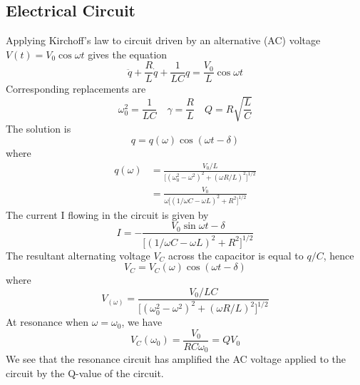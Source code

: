 \documentclass[../../../main.tex]{subfiles}
\begin{document}
\subsection{Electrical Circuit}
Applying Kirchoff's law to circuit driven by an alternative (AC) voltage $V (t) = V_0 \cos \omega t$ gives the equation
\begin{equation*}
    \ddot{q}+\frac{R}{L}\dot{q}+\frac{1}{LC}q=\frac{V_0}{L} \cos \omega t
\end{equation*}
Corresponding replacements are
\begin{equation*}
    \omega_0^2=\frac{1}{LC}\quad\gamma=\frac{R}{L}\quad Q=R\sqrt{\frac{L}{C}}
\end{equation*}
The solution is 
\begin{equation*}
    q=q(\omega)\cos (\omega t-\delta )
\end{equation*}
where
\begin{align*}
    q(\omega)&=\frac{V_0/L}{\big[(\omega_0^2- \omega^2)^2 +(\omega R/L)^2\big]^{1/2}}\\
    &= \frac{V_0}{\omega\big[(1/\omega C- \omega L)^2 +R^2\big]^{1/2} }
\end{align*}
The current I flowing in the circuit is given by
\begin{equation*}
    I=-\frac{V_0\sin \omega t-\delta}{\big[(1/\omega C- \omega L)^2 +R^2\big]^{1/2} }
\end{equation*}
The resultant alternating voltage $V_C$ across the capacitor is equal to $q/C$, hence
\begin{equation*}
    V_C=V_C(\omega)\cos (\omega t-\delta )
\end{equation*}
where
\begin{equation*}
    V_(\omega)= \frac{V_0/LC}{\big[(\omega_0^2- \omega^2)^2 +(\omega R/L)^2\big]^{1/2}} 
\end{equation*}
At resonance when $\omega = \omega_0$, we have
\begin{equation*}
    V_C(\omega_0)=\frac{V_0}{RC\omega_0}=QV_0
\end{equation*}
We see that the resonance circuit has amplified the AC voltage applied to the circuit by the Q-value of the circuit. 
\end{document}
